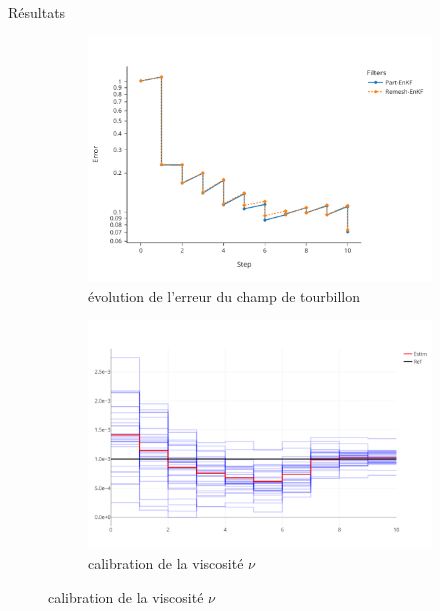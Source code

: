\documentclass[aspectratio=169]{beamer} %
\begin{document}
\begin{frame}{Résultats}

    \begin{figure}
        \begin{subfigure}{0.49\textwidth}
            \includegraphics[width=\textwidth]{../../conference/images/dipole_results/error_in_time.pdf}
            \caption*{évolution de l'erreur du champ de tourbillon}
        \end{subfigure}
        \begin{subfigure}{0.49\textwidth}
            \includegraphics[width=\textwidth]{../../conference/images/dipole_results/visc_rmf.png}
            \caption*{calibration de la viscosité $\nu$}
        \end{subfigure}
    \end{figure}
\end{frame}
\end{document}
